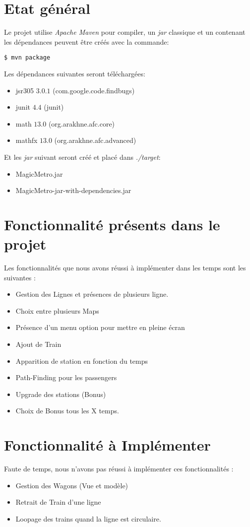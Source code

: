 \documentclass[report, backcover, french, nodocumentinfo]{upmethodology-document}
\begin{document}
	\upmdocumentsummary{}
	\upmdocumentauthors{}
	\upmdocumentinformedpeople{}
	\upmpublicationpage{}

	\newpage{}
	\section{Etat général}
		\p{}
			Le projet utilise \textit{Apache Maven} pour compiler, un \textit{jar} classique et un contenant les dépendances peuvent être créés avec la commande:
			\begin{Verbatim}[frame=single]
$ mvn package
			\end{Verbatim}
			Les dépendances suivantes seront téléchargées:
			\begin{itemize}
				\item jsr305 $3.0.1$ (com.google.code.findbugs)
				\item junit $4.4$ (junit)
				\item math $13.0$ (org.arakhne.afc.core)
				\item mathfx $13.0$ (org.arakhne.afc.advanced)
			\end{itemize}
			Et les \textit{jar} suivant seront créé et placé dans \textit{./target}:
			\begin{itemize}
				\item MagicMetro.jar
				\item MagicMetro-jar-with-dependencies.jar
			\end{itemize}
	\section{Fonctionnalité présents dans le projet}
		\p{}
		Les fonctionnalités que nous avons réussi à implémenter dans les temps sont les suivantes : 
		\begin{itemize}
			\item Gestion des Lignes et présences de plusieurs ligne.
			\item Choix entre plusieurs Maps
			\item Présence d'un menu option pour mettre en pleine écran
			\item Ajout de Train
			\item Apparition de station en fonction du temps
			\item Path-Finding pour les passengers
			\item Upgrade des stations (Bonus)
			\item Choix de Bonus tous les X temps.
		\end{itemize}
	\section{Fonctionnalité à Implémenter}
		\p{}
		Faute de temps, nous n'avons pas réussi à implémenter ces fonctionnalités : 
		\begin{itemize}
			\item Gestion des Wagons (Vue et modèle)
			\item Retrait de Train d'une ligne
			\item Loopage des trains quand la ligne est circulaire.
		\end{itemize}
\end{document}
